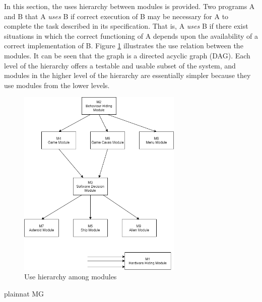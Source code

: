 \documentclass[12pt, titlepage]{article}
\begin{document}
In this section, the uses hierarchy between modules is
provided. Two programs A and B that A {\em uses} B if
correct execution of B may be necessary for A to complete the task described in
its specification. That is, A {\em uses} B if there exist situations in which
the correct functioning of A depends upon the availability of a correct
implementation of B.  Figure \ref{FigUH} illustrates the use relation between
the modules. It can be seen that the graph is a directed acyclic graph
(DAG). Each level of the hierarchy offers a testable and usable subset of the
system, and modules in the higher level of the hierarchy are essentially simpler
because they use modules from the lower levels.

\begin{figure}[H]
\centering
\includegraphics[width=0.7\textwidth]{modules.png}
\caption{Use hierarchy among modules}
\label{FigUH}
\end{figure}


 {plainnat}
 {MG}
\end{document}
